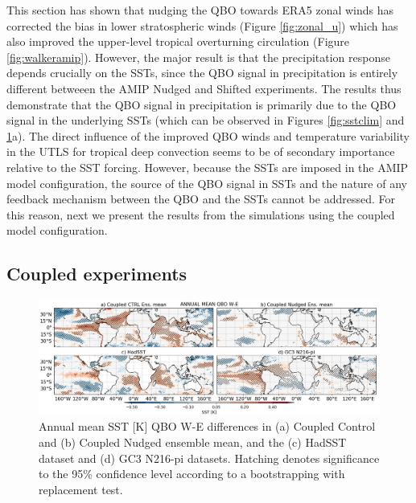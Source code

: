 
This section has shown that nudging the QBO towards ERA5 zonal winds has corrected the bias in lower stratospheric winds (Figure \ref{fig:zonal_u}) which has also improved the upper-level tropical overturning circulation (Figure \ref{fig:walkeramip}). However, the major result is that the precipitation response depends crucially on the SSTs, since the QBO signal in precipitation is entirely different betweeen the AMIP Nudged and Shifted experiments. The results thus demonstrate that the QBO signal in precipitation is primarily due to the QBO signal in the underlying SSTs (which can be observed in Figures \ref{fig:sstclim} and \ref{fig:sst_clim_coupled}a).
 The direct influence of the improved QBO winds and temperature variability in the UTLS for tropical deep convection seems to be of secondary importance relative to the SST forcing. However, because the SSTs are imposed in the AMIP model configuration, the source of the QBO signal in SSTs and the nature of any feedback mechanism between the QBO and the SSTs cannot be addressed. For this reason, next we present the results from the simulations using the coupled model configuration.  


\subsection{Coupled experiments}

\begin{figure}[t!]
\centering
 \includegraphics[width=\linewidth]{figures/sstseasonal_climqbowqboe.png}
\caption[Annual mean SST response to the QBO in coupled nudged experiments]{ Annual mean SST [K] QBO W-E differences in (a) Coupled Control and (b) Coupled Nudged ensemble mean, and the (c) HadSST dataset and (d) GC3 N216-pi datasets. Hatching denotes significance to the 95\% confidence level according to a bootstrapping with replacement test.}
\label{fig:sst_clim_coupled}
\end{figure}


